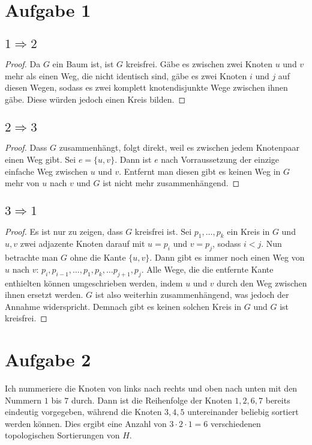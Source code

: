 \documentclass[10pt,a4paper]{article}
\begin{document}
\section{Aufgabe 1}

\subsection{$1 \Rightarrow 2$}
\begin{proof}
  Da $G$ ein Baum ist, ist $G$ kreisfrei.
  Gäbe es zwischen zwei Knoten $u$ und $v$ mehr als einen Weg, die nicht identisch sind, gäbe es zwei Knoten $i$ und $j$ auf diesen Wegen, sodass es zwei komplett knotendisjunkte Wege zwischen ihnen gäbe.
  Diese würden jedoch einen Kreis bilden.
\end{proof}

\subsection{$2 \Rightarrow 3$}
\begin{proof}
  Dass $G$ zusammenhängt, folgt direkt, weil es zwischen jedem Knotenpaar einen Weg gibt.
  Sei $e = \{u, v\}$.
  Dann ist $e$ nach Vorraussetzung der einzige einfache Weg zwischen $u$ und $v$.
  Entfernt man diesen gibt es keinen Weg in $G$ mehr von $u$ nach $v$ und $G$ ist nicht mehr zusammenhängend.
\end{proof}

\subsection{$3 \Rightarrow 1$}
\begin{proof}
  Es ist nur zu zeigen, dass $G$ kreisfrei ist.
  Sei $p_{1}, \dots, p_{k}$ ein Kreis in $G$ und $u, v$ zwei adjazente Knoten darauf mit $u = p_{i}$ und $v = p_{j}$, sodass $i < j$.
  Nun betrachte man $G$ ohne die Kante $\{u, v\}$.
  Dann gibt es immer noch einen Weg von $u$ nach $v$: $p_{i}, p_{i - 1}, \dots, p_{1}, p_{k}, \dots p_{j + 1}, p_{j}$.
  Alle Wege, die die entfernte Kante enthielten können umgeschrieben werden, indem $u$ und $v$ durch den Weg zwischen ihnen ersetzt werden.
  $G$ ist also weiterhin zusammenhängend, was jedoch der Annahme widerspricht.
  Demnach gibt es keinen solchen Kreis in $G$ und $G$ ist kreisfrei.
\end{proof}

\section{Aufgabe 2}
Ich nummeriere die Knoten von links nach rechts und oben nach unten mit den Nummern $1$ bis $7$ durch.
Dann ist die Reihenfolge der Knoten $1, 2, 6, 7$ bereits eindeutig vorgegeben, während die Knoten $3, 4, 5$ untereinander beliebig sortiert werden können.
Dies ergibt eine Anzahl von $3 \cdot 2 \cdot 1 = 6$ verschiedenen topologischen Sortierungen von $H$.
\end{document}
